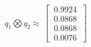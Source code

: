 \documentclass[preview]{standalone}
\begin{document}
\begin{center}
$q_1 \bigotimes q_2 \approx \
                \begin{bmatrix}\
                    0.9924 \\\
                    0.0868 \\\
                    0.0868 \\\
                    0.0076\
                \end{bmatrix}$
\end{center}
\end{document}
